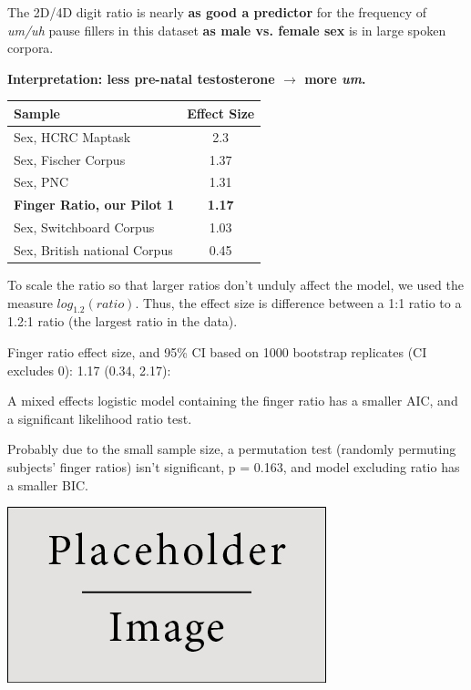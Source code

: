 \documentclass[a0,portrait]{a0poster}
\begin{document}
\begin{multicols}{2}
The 2D/4D digit ratio is nearly \textbf{as good a predictor} for the frequency of \textsl{um/uh} pause fillers in this dataset \textbf{as male vs. female sex} is in large spoken corpora.
\begin{center}
\noindent\textbf{Interpretation: less pre-natal testosterone $\rightarrow$ more \textsl{um}.}
\end{center}
\begin{table} %
\begin{tabular}{l c}
\toprule
\textbf{Sample} & \textbf{Effect Size}\\
\midrule
Sex, HCRC Maptask & 2.3\\
Sex, Fischer Corpus & 1.37\\
Sex, PNC & 1.31\\
\textbf{Finger Ratio, our Pilot 1} & \textbf{1.17}\\
Sex, Switchboard Corpus & 1.03\\
Sex, British national Corpus & 0.45\\
\bottomrule
\end{tabular}
\end{table}

To scale the ratio so that larger ratios don't unduly affect the model, we used the measure $log_1.2(ratio)$. Thus, the effect size is difference between a 1:1 ratio to a 1.2:1 ratio (the largest ratio in the data).

Finger ratio effect size, and 95\% CI based on 1000 bootstrap replicates (CI excludes 0): 1.17 (0.34, 2.17):

A mixed effects logistic model containing the finger ratio has a smaller AIC, and a significant likelihood ratio test.

Probably due to the small sample size, a permutation test (randomly permuting subjects' finger ratios) isn't significant, p = 0.163, and model excluding ratio has a smaller BIC.


\begin{center}\vspace{1cm}
\includegraphics[width=0.8\linewidth]{placeholder}
\end{center}\vspace{1cm}


\end{multicols}
\end{document}
